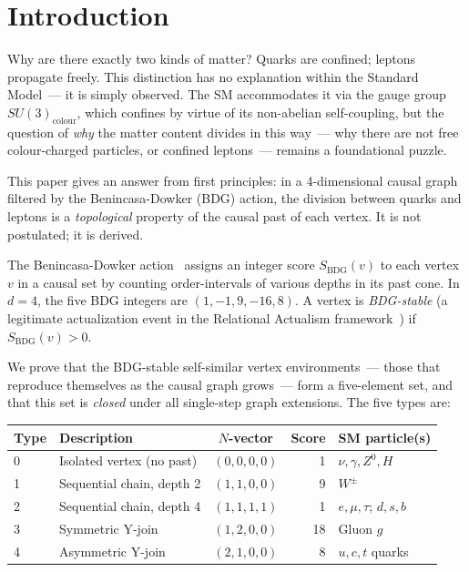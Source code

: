 \documentclass[11pt,a4paper]{article}
\newcommand{\SBDG}{S_{\mathrm{BDG}}}
\begin{document}
\section{Introduction}
\label{sec:intro}

Why are there exactly two kinds of matter? Quarks are confined; leptons
propagate freely. This distinction has no explanation within the Standard
Model~--- it is simply observed. The SM accommodates it via the gauge
group $SU(3)_{\mathrm{colour}}$, which confines by virtue of its
non-abelian self-coupling, but the question of \emph{why} the matter
content divides in this way~--- why there are not free colour-charged
particles, or confined leptons~--- remains a foundational puzzle.

This paper gives an answer from first principles: in a 4-dimensional
causal graph filtered by the Benincasa-Dowker (BDG) action, the division
between quarks and leptons is a \emph{topological} property of the
causal past of each vertex. It is not postulated; it is derived.

The Benincasa-Dowker action~\citep{Benincasa2010,Dowker2013} assigns an
integer score $\SBDG(v)$ to each vertex $v$ in a causal set by counting
order-intervals of various depths in its past cone. In $d=4$, the five
BDG integers are $(1,-1,9,-16,8)$. A vertex is \emph{BDG-stable}
(a legitimate actualization event in the Relational Actualism
framework~\citep{Sandeman2026RAQM}) if $\SBDG(v) > 0$.

We prove that the BDG-stable self-similar vertex environments~--- those
that reproduce themselves as the causal graph grows~--- form a
five-element set, and that this set is \emph{closed} under all
single-step graph extensions. The five types are:

\begin{center}
\renewcommand{\arraystretch}{1.25}
\begin{tabular}{llcrl}
\toprule
Type & Description & $N$-vector & Score & SM particle(s) \\
\midrule
0 & Isolated vertex (no past) & $(0,0,0,0)$ & 1 & $\nu,\gamma,Z^0,H$ \\
1 & Sequential chain, depth 2 & $(1,1,0,0)$ & 9 & $W^{\pm}$ \\
2 & Sequential chain, depth 4 & $(1,1,1,1)$ & 1 & $e,\mu,\tau$; $d,s,b$ \\
3 & Symmetric Y-join & $(1,2,0,0)$ & 18 & Gluon $g$ \\
4 & Asymmetric Y-join & $(2,1,0,0)$ & 8 & $u,c,t$ quarks \\
\bottomrule
\end{tabular}
\end{center}
\end{document}
